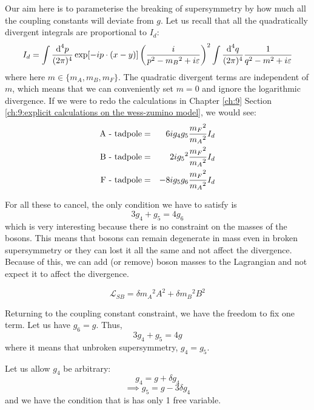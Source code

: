 Our aim here is to parameterise the breaking of supersymmetry by how much all the coupling constants will deviate from $g$. Let us recall that all the quadratically divergent integrals are proportional to $I_d$:
\begin{equation}
    I_d = \int \frac{\text{d}^4 p}{(2\pi)^4} \exp[-i p \cdot (x-y) ]\left(\frac{i}{p^2 - {m_B}^2 + i \varepsilon}\right)^2 \int\frac{\text{d}^4 q}{(2\pi)^4} \frac{1}{q^2 - m^2 + i\varepsilon}
\end{equation}
where here $m \in \{m_A , m_B, m_F\}$. The quadratic divergent terms are independent of $m$, which means that we can conveniently set $m = 0$ and ignore the logarithmic divergence. If we were to redo the calculations in Chapter \ref{ch:9} Section \ref{ch:9:explicit calculations on the wess-zumino model}, we would see:
\begin{eqnarray}
    \text{A - tadpole} &=& 6i g_4 g_5 \frac{{m_F}^2}{{m_A}^2} I_d \nonumber \\
    \text{B - tadpole} &=& 2i {g_5}^2 \frac{{m_F}^2}{{m_A}^2} I_d \nonumber \\
    \text{F - tadpole} &=& -8ig_5 g_6 \frac{{m_F}^2}{{m_A}^2} I_d \nonumber
\end{eqnarray}

For all these to cancel, the only condition we have to satisfy is
\begin{equation}
    3g_4 + g_5 = 4g_6
    \label{eqn:14:g constraint}
\end{equation}
which is very interesting because there is no constraint on the masses of the bosons. This means that bosons can remain degenerate in mass even in broken supersymmetry or they can lost it all the same and not affect the divergence. Because of this, we can add (or remove) boson masses to the Lagrangian and not expect it to affect the divergence.

\begin{equation}
    \mathcal{L}_{SB} = \delta {m_A}^2 A^2 + \delta {m_B}^2 B^2
\end{equation}

Returning to the coupling constant constraint, we have the freedom to fix one term. Let us have $g_6 = g$. Thus,
\begin{equation}
    3g_4 + g_5 = 4g
\end{equation}
where it means that unbroken supersymmetry, $g_4 = g_5$.

Let us allow $g_4$ be arbitrary:
\begin{equation}
    g_4 = g + \delta g_4
\end{equation}
\begin{equation}
    \implies g_5 = g - 3\delta g_4
\end{equation}
and we have the condition that is has only 1 free variable.

